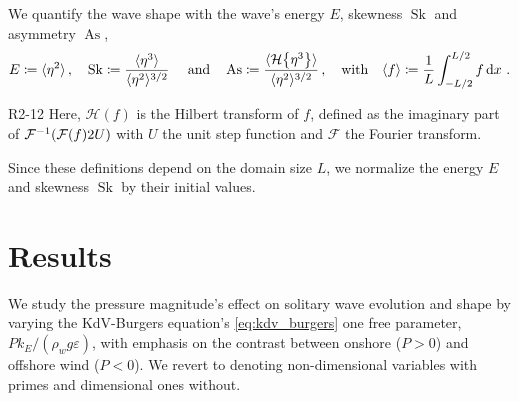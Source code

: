 \documentclass{jfm}
\DeclareMathOperator{\Sk}{Sk}
\DeclareMathOperator{\As}{As}
\newcommand{\fourier}{\mathcal{F}}
\newcommand{\hilbert}{\mathcal{H}}
\renewcommand*{\epsilon}{\varepsilon}
\begin{document}
We quantify the wave shape with the wave's energy $E$, skewness $\Sk$
and asymmetry $\As$,
\begin{equation}
  E \coloneqq \langle \eta^2 \rangle \,, \quad
  \Sk \coloneqq \frac{\langle \eta^3 \rangle}{\langle \eta^2
  \rangle^{3/2}} \
  \qq{and}
  \As \coloneqq \frac{\langle \hilbert \Bqty{\eta^3} \rangle}{\langle
    \eta^2 \rangle^{3/2}}
  \,, \qq{with}
  \langle f \rangle \coloneqq \frac{1}{L} \int_{-L/2}^{L/2} f
  \dd{x} \,.
  \label{eq:shape_stats_def}
\end{equation}
\begin{LineLabel}{R2-12}
Here, $\hilbert(f)$ is the Hilbert transform of $f$, defined as the
imaginary part of $\fourier^{-1} \pqty{ \fourier \pqty{f} 2U}$ with $U$
the unit step function and $\fourier$ the Fourier transform.
\end{LineLabel}
Since these definitions depend on the domain size $L$, we normalize the
energy $E$ and skewness $\Sk$ by their initial values.

\section{\label{sec:results} Results}
We study the pressure magnitude's effect on solitary
wave evolution and shape by varying the KdV-Burgers equation's
\cref{eq:kdv_burgers} one free parameter, $P k_E/(\rho_w g \epsilon)$,
with emphasis on the contrast between onshore ($P > 0$) and offshore
wind ($P < 0$).
We revert to denoting non-dimensional variables with primes and
dimensional ones without.
\end{document}
